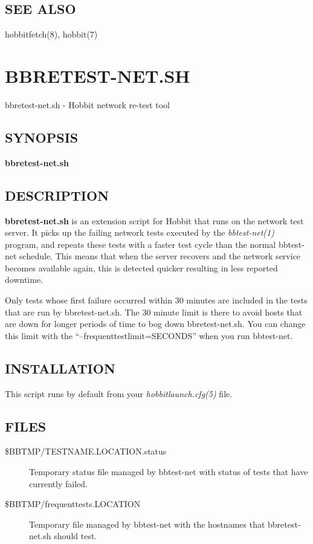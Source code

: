 \subsection{SEE ALSO}
hobbitfetch(8), hobbit(7) 
  
%
\newpage
\section{BBRETEST-NET.SH}

 bbretest-net.sh - Hobbit network re-test tool

 \subsection{SYNOPSIS}
\textbf{bbretest-net.sh}


 
\subsection{DESCRIPTION}
\textbf{bbretest-net.sh}
 is an extension script for Hobbit that runs on the network test
 server. It picks up the failing network tests executed by the
 \emph{bbtest-net(1)} program, and repeats these tests with a faster
 test cycle than the normal bbtest-net schedule. This means that when
 the server recovers and the network service becomes available again,
 this is detected quicker resulting in less reported downtime. 


  Only tests whose first failure occurred within 30 minutes are
  included in the tests that are run by bbretest-net.sh. The 30 minute
  limit is there to avoid hosts that are down for longer periods of
  time to bog down bbretest-net.sh. You can change this limit with the
  ``--frequenttestlimit=SECONDS'' when you run bbtest-net. 



 


 
\subsection{INSTALLATION}
 This script runs by default from your \emph{hobbitlaunch.cfg(5)}
 file. 

 


 
\subsection{FILES}
\begin{description}
\item[\$BBTMP/TESTNAME.LOCATION.status] Temporary status file managed
  by bbtest-net with status of tests that have currently failed. 

\item[\$BBTMP/frequenttests.LOCATION] Temporary file managed by
  bbtest-net with the hostnames that bbretest-net.sh should test. 


 


\end{description}
